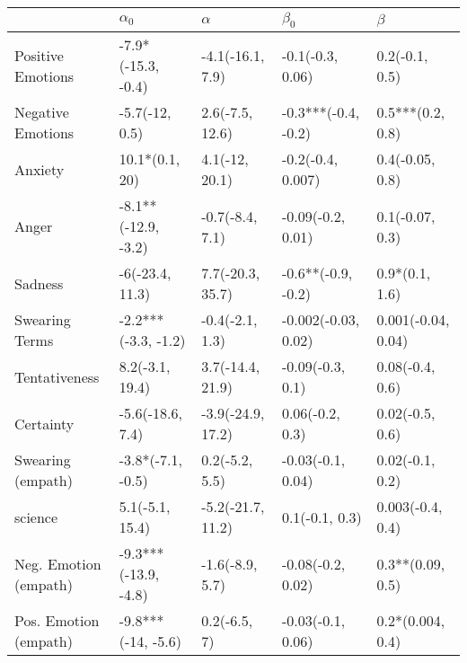 \begin{tabular}{lllll}
\toprule
{} &            $\alpha_0$ &           $\alpha$ &            $\beta_0$ &             $\beta$ \\
\midrule
Positive Emotions     &    -7.9*(-15.3, -0.4) &   -4.1(-16.1, 7.9) &     -0.1(-0.3, 0.06) &      0.2(-0.1, 0.5) \\
Negative Emotions     &        -5.7(-12, 0.5) &    2.6(-7.5, 12.6) &  -0.3***(-0.4, -0.2) &    0.5***(0.2, 0.8) \\
Anxiety               &        10.1*(0.1, 20) &     4.1(-12, 20.1) &    -0.2(-0.4, 0.007) &     0.4(-0.05, 0.8) \\
Anger                 &   -8.1**(-12.9, -3.2) &    -0.7(-8.4, 7.1) &    -0.09(-0.2, 0.01) &     0.1(-0.07, 0.3) \\
Sadness               &       -6(-23.4, 11.3) &   7.7(-20.3, 35.7) &   -0.6**(-0.9, -0.2) &      0.9*(0.1, 1.6) \\
Swearing Terms        &   -2.2***(-3.3, -1.2) &    -0.4(-2.1, 1.3) &  -0.002(-0.03, 0.02) &  0.001(-0.04, 0.04) \\
Tentativeness         &       8.2(-3.1, 19.4) &   3.7(-14.4, 21.9) &     -0.09(-0.3, 0.1) &     0.08(-0.4, 0.6) \\
Certainty             &      -5.6(-18.6, 7.4) &  -3.9(-24.9, 17.2) &      0.06(-0.2, 0.3) &     0.02(-0.5, 0.6) \\
Swearing (empath)     &     -3.8*(-7.1, -0.5) &     0.2(-5.2, 5.5) &    -0.03(-0.1, 0.04) &     0.02(-0.1, 0.2) \\
science               &       5.1(-5.1, 15.4) &  -5.2(-21.7, 11.2) &       0.1(-0.1, 0.3) &    0.003(-0.4, 0.4) \\
Neg. Emotion (empath) &  -9.3***(-13.9, -4.8) &    -1.6(-8.9, 5.7) &    -0.08(-0.2, 0.02) &    0.3**(0.09, 0.5) \\
Pos. Emotion (empath) &    -9.8***(-14, -5.6) &       0.2(-6.5, 7) &    -0.03(-0.1, 0.06) &    0.2*(0.004, 0.4) \\
\bottomrule
\end{tabular}
